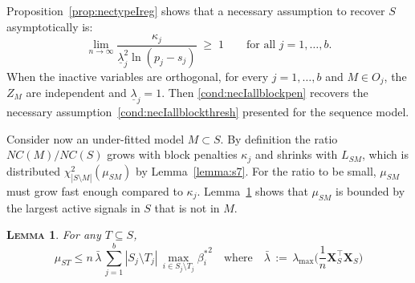 \documentclass[aos]{imsart}
\theoremstyle{plain}
\newtheorem{lem}[thm]{\textsc{Lemma}}
\newcommand{\paul}[1]{{\small{\color{green} \sf $\spadesuit$ Paul: #1}}}
\newcommand{\bs}{\boldsymbol}
\begin{document}

Proposition~\ref{prop:nectypeIreg} shows that 
a necessary assumption to recover $S$ asymptotically
is: 
\begin{equation}\label{cond:necIallblockpen}
\lim_{n\to\infty}\frac{\kappa_j}{\underline{\lambda}_j^2\ln(p_j-s_j)}\;\geq\;1\qquad\mbox{for all }j=1,\ldots,b.
\end{equation}
When the inactive variables are orthogonal, for every $j=1,\ldots,b$ and $M\in O_j$, the $Z_M$ are independent and $\underline{\lambda}_j=1$. Then \eqref{cond:necIallblockpen} recovers %
the necessary assumption~\eqref{cond:necIallblockthresh} presented for the sequence model.

Consider now an under-fitted model $M\subset S$. %
By definition the ratio $NC(M)/NC(S)$ %
grows with block penalties $\kappa_j$ and shrinks with $L_{SM}$, which is distributed $\chi^2_{|S\setminus M|}(\mu_{SM})$ by Lemma~\ref{lemma:s7}.
For the ratio to be small, $\mu_{SM}$ must grow
fast enough compared to $\kappa_j$. Lemma~\ref{lem:upperboundnoncentral} shows that $\mu_{SM}$ is bounded by the largest active signals in $S$ that is not in $M$.
\begin{lem}\label{lem:upperboundnoncentral}
    For any $T\subseteq S$, $$\mu_{ST} \leq n\,\bar{\lambda}\,\sum_{j=1}^b|S_j\setminus T_j|\,\max_{i\in S_j\setminus T_j}{\beta_{i}^*}^2 \quad \text{where}\quad \bar{\lambda}\,:=\,\lambda_{\max}\Big(\frac1n \bs X_{S}^\top\bs X_{S}\Big)$$
\end{lem}
\end{document}
